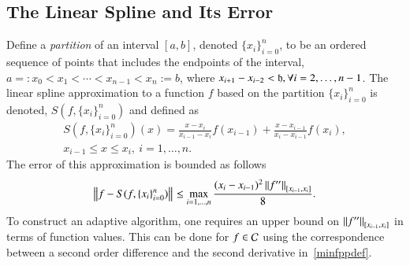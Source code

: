 \documentclass[review]{elsarticle}
\newcommand{\datasites}{\{x_i\}_{i=0}^n}
\theoremstyle{definition}
\begin{document}
\subsection{The Linear Spline and Its Error}

Define a \emph{partition} of an interval $[a, b]$, denoted $\datasites$, to be
an ordered sequence of points that includes the endpoints of the interval,
$a=:x_0 < x_1 < \cdots < x_{n-1} < x_{n}:=b$, where $x_{i+1}-x_{i-2} <\fh, \forall i=2,\ldots, n-1$.  The linear spline
approximation to a function $f$ based on the partition $\datasites$ is denoted,
$S(f,\datasites)$ and defined as
\begin{multline} \label{splinedef}
S(f,\datasites)(x) =  \frac{x-x_i}{x_{i-1} - x_i} f(x_{i-1}) + \frac{x-x_{i-1}}{x_{i} - x_{i-1}}f(x_i), \\ x_{i-1} \le x \le x_i, \ i=1, \ldots, n.
\end{multline}
The error of this approximation is bounded as follows \cite{??}
\begin{equation} \label{appxerrbda}
\norm{f - S(f,\datasites)} \le \max_{i=1, \ldots, n} \frac{(x_i - x_{i-1})^2\norm[{[x_{i-1},x_i]}]{f''}}{8}.
\end{equation}
To construct an adaptive algorithm, one requires an upper bound on
$\norm[{[x_{i-1},x_i]}]{f''}$ in terms of function values. This can be done for
$f \in \cc$ using the correspondence between a second order difference and the
second derivative in~\eqref{minfppdef}.
\end{document}
